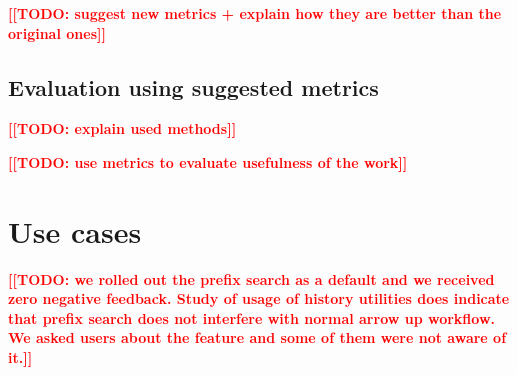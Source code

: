 \documentclass[thesis=M,english]{FITthesis}[2012/10/20]
\newcommand{\todotext}[1]{\textcolor{red}{\textbf{[[#1]]}}}
\begin{document}
\todotext{TODO: suggest new metrics + explain how they are better than the original ones}

\subsection{Evaluation using suggested metrics}

\todotext{TODO: explain used methods}

\todotext{TODO: use metrics to evaluate usefulness of the work}


\section{Use cases}

\todotext{TODO: we rolled out the prefix search as a default and we received zero negative feedback. Study of usage of history utilities does indicate that prefix search does not interfere with normal arrow up workflow. We asked users about the feature and some of them were not aware of it.}
\end{document}
